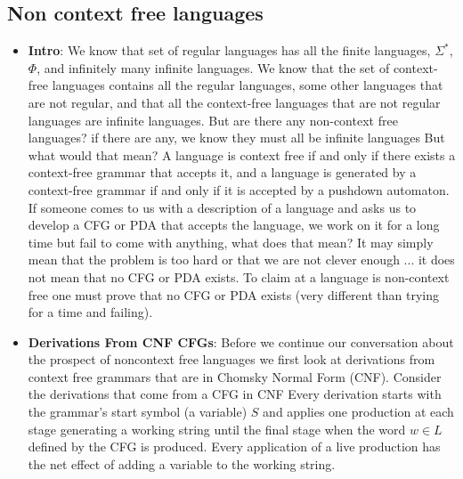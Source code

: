 \documentclass{report}
\begin{document}
    \subsection{Non context free languages}
    \begin{itemize}
        \item \textbf{Intro}:
            We know that set of regular languages has all the finite languages, $\Sigma^{*}$, $\Phi$, and infinitely many infinite languages.
            \bigbreak \noindent 
            We know that the set of context-free languages contains all the regular languages, some other languages that are not regular, and that all the context-free languages that are not regular languages are infinite languages.
            \bigbreak \noindent 
            But are there any non-context free languages?  if there are any, we know they must all be infinite languages
            \bigbreak \noindent 
            But what would that mean? 
            \bigbreak \noindent 
            A language is context free if and only if there exists a context-free grammar that accepts it, and
            \bigbreak \noindent 
                a language is generated by a context-free grammar if and only if it is accepted by a pushdown automaton.
                \bigbreak \noindent 
                If someone comes to us with a description of a language and asks us to develop a CFG or PDA that accepts the language, we work on it for a long time but fail to come with anything, what does that mean?
                \bigbreak \noindent 
                It may simply mean that the problem is too hard or that we are not clever enough ... it does not mean that no CFG or PDA exists.
                \bigbreak \noindent 
                To claim at a language is non-context free one must prove that no CFG or PDA exists (very different than trying for a time and failing).
        \item \textbf{Derivations From CNF CFGs}: Before we continue our conversation about the prospect of noncontext free languages we first look at derivations from context free grammars that are in Chomsky Normal Form (CNF).
            \bigbreak \noindent 
            Consider the derivations that come from a CFG in CNF
            \bigbreak \noindent 
            Every derivation starts with the grammar's start symbol (a variable) $S$ and applies one production at each stage generating a working string until the final stage when the word $w \in L$ defined by the CFG is produced.
            \bigbreak \noindent 
            Every application of a live production has the net effect of adding a variable to the working string.

\end{itemize}
\end{document}
